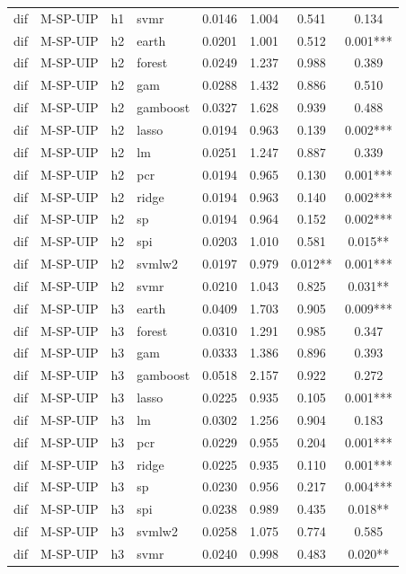 \begin{ThreePartTable}
\begin{longtable}[t]{llclcccc}
dif & M-SP-UIP & h1 & svmr & 0.0146 & 1.004 & 0.541 & 0.134\\
\addlinespace
dif & M-SP-UIP & h2 & earth & 0.0201 & 1.001 & 0.512 & 0.001***\\
dif & M-SP-UIP & h2 & forest & 0.0249 & 1.237 & 0.988 & 0.389\\
dif & M-SP-UIP & h2 & gam & 0.0288 & 1.432 & 0.886 & 0.510\\
dif & M-SP-UIP & h2 & gamboost & 0.0327 & 1.628 & 0.939 & 0.488\\
dif & M-SP-UIP & h2 & lasso & 0.0194 & 0.963 & 0.139 & 0.002***\\
dif & M-SP-UIP & h2 & lm & 0.0251 & 1.247 & 0.887 & 0.339\\
dif & M-SP-UIP & h2 & pcr & 0.0194 & 0.965 & 0.130 & 0.001***\\
dif & M-SP-UIP & h2 & ridge & 0.0194 & 0.963 & 0.140 & 0.002***\\
dif & M-SP-UIP & h2 & sp & 0.0194 & 0.964 & 0.152 & 0.002***\\
dif & M-SP-UIP & h2 & spi & 0.0203 & 1.010 & 0.581 & 0.015**\\
dif & M-SP-UIP & h2 & svmlw2 & 0.0197 & 0.979 & 0.012** & 0.001***\\
dif & M-SP-UIP & h2 & svmr & 0.0210 & 1.043 & 0.825 & 0.031**\\
\addlinespace
dif & M-SP-UIP & h3 & earth & 0.0409 & 1.703 & 0.905 & 0.009***\\
dif & M-SP-UIP & h3 & forest & 0.0310 & 1.291 & 0.985 & 0.347\\
dif & M-SP-UIP & h3 & gam & 0.0333 & 1.386 & 0.896 & 0.393\\
dif & M-SP-UIP & h3 & gamboost & 0.0518 & 2.157 & 0.922 & 0.272\\
dif & M-SP-UIP & h3 & lasso & 0.0225 & 0.935 & 0.105 & 0.001***\\
dif & M-SP-UIP & h3 & lm & 0.0302 & 1.256 & 0.904 & 0.183\\
dif & M-SP-UIP & h3 & pcr & 0.0229 & 0.955 & 0.204 & 0.001***\\
dif & M-SP-UIP & h3 & ridge & 0.0225 & 0.935 & 0.110 & 0.001***\\
dif & M-SP-UIP & h3 & sp & 0.0230 & 0.956 & 0.217 & 0.004***\\
dif & M-SP-UIP & h3 & spi & 0.0238 & 0.989 & 0.435 & 0.018**\\
dif & M-SP-UIP & h3 & svmlw2 & 0.0258 & 1.075 & 0.774 & 0.585\\
dif & M-SP-UIP & h3 & svmr & 0.0240 & 0.998 & 0.483 & 0.020**\\

\end{longtable}
\end{ThreePartTable}
